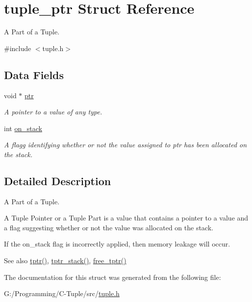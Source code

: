 \hypertarget{structtuple__ptr}{}\section{tuple\+\_\+ptr Struct Reference}
\label{structtuple__ptr}


A Part of a Tuple.  




{\ttfamily \#include $<$tuple.\+h$>$}

\subsection*{Data Fields}
\begin{DoxyCompactItemize}
\item 
void $\ast$ \hyperlink{structtuple__ptr_add9af9569af79ec26dd741fb226b38ba}{ptr}\hypertarget{structtuple__ptr_add9af9569af79ec26dd741fb226b38ba}{}\label{structtuple__ptr_add9af9569af79ec26dd741fb226b38ba}

\begin{DoxyCompactList}\small\item\em A pointer to a value of any type. \end{DoxyCompactList}\item 
int \hyperlink{structtuple__ptr_a5b5a4edd9167c9c2937631f949963954}{on\+\_\+stack}\hypertarget{structtuple__ptr_a5b5a4edd9167c9c2937631f949963954}{}\label{structtuple__ptr_a5b5a4edd9167c9c2937631f949963954}

\begin{DoxyCompactList}\small\item\em A flagg identifying whether or not the value assigned to ptr has been allocated on the stack. \end{DoxyCompactList}\end{DoxyCompactItemize}


\subsection{Detailed Description}
A Part of a Tuple. 

A Tuple Pointer or a Tuple Part is a value that contains a pointer to a value and a flag suggesting whether or not the value was allocated on the stack.

If the on\+\_\+stack flag is incorrectly applied, then memory leakage will occur.

\begin{DoxySeeAlso}{See also}
\hyperlink{tuple_8h_aab8b4f7c3d6ed7f76939d132d9656f60}{tptr()}, \hyperlink{tuple_8h_ad407b45f88fa00ec6e549b5b4f214acc}{tptr\+\_\+stack()}, \hyperlink{tuple_8h_a5f040f5026ad0e268ef7d2caf0544bb2}{free\+\_\+tptr()} 
\end{DoxySeeAlso}


The documentation for this struct was generated from the following file\+:\begin{DoxyCompactItemize}
\item 
G\+:/\+Programming/\+C-\/\+Tuple/src/\hyperlink{tuple_8h}{tuple.\+h}\end{DoxyCompactItemize}
